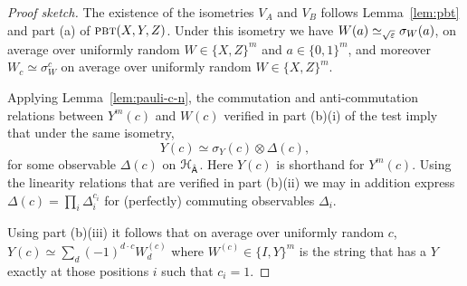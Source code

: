 \begin{proof}[Proof sketch]
The existence of the isometries $V_A$ and $V_B$ follows Lemma~\ref{lem:pbt} and part (a) of $\textsc{pbt}(X,Y,Z)$. 
 Under this isometry we have $W(a) \simeq_{\sqrt{\varepsilon}} \sigma_W(a)$, on average over uniformly random $W\in\{X,Z\}^m$ and $a\in\{0,1\}^m$, and moreover $W_c \simeq \sigma_W^c$ on average over uniformly random $W\in\{X,Z\}^m$. 

Applying Lemma~\ref{lem:pauli-c-n},  the  commutation and anti-commutation relations between $Y^m(c)$ and $W(c)$ verified in part (b)(i) of the test imply that under the same isometry,
$$ Y(c) \simeq \sigma_Y(c) \otimes {\Delta}(c),$$
for some observable ${\Delta}(c)$ on ${\mathcal{H}}_{\hat{{\textsf{A}}}}$. Here $Y(c)$ is shorthand for $Y^m(c)$. Using the linearity relations that are verified in part (b)(ii) we may in addition express $\Delta(c) = \prod_i \Delta_{i}^{c_i}$ for (perfectly) commuting observables $\Delta_i$. 




Using part (b)(iii) it follows that on average over uniformly random $c$, $Y(c)\simeq \sum_d  (-1)^{d\cdot c} W^{(c)}_d$ where $W^{(c)} \in \{I,Y\}^m$ is the string that has a $Y$ exactly at those positions $i$ such that $c_i=1$. 



\end{proof}
